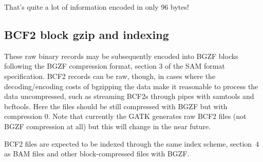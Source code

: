 \documentclass[8pt]{article}
\begin{document}
That's quite a lot of information encoded in only 96 bytes!

\subsection{BCF2 block gzip and indexing}

These raw binary records may be subsequently encoded into BGZF blocks following
the BGZF compression format, section 3 of the SAM format specification.
BCF2 records can be raw, though, in cases where the decoding/encoding costs of
bgzipping the data make it reasonable to process the data uncompressed, such as
streaming BCF2s through pipes with samtools and bcftools.  Here the files
should be still compressed with BGZF but with compression 0.  Note that
currently the GATK generates raw BCF2 files (not BGZF compression at all) but
this will change in the near future.

BCF2 files are expected to be indexed through the same index scheme,
section~4 as BAM files and other block-compressed files with BGZF.
\end{document}

